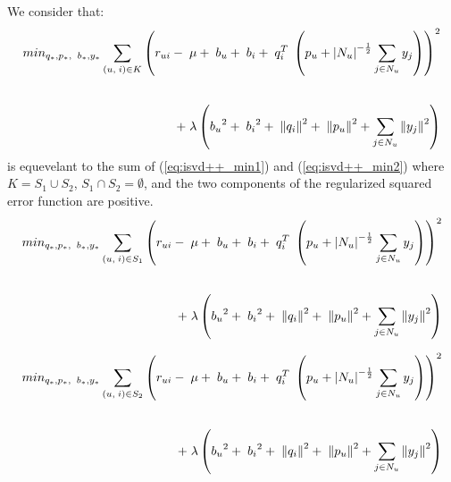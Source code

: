 \documentclass[oneside,13pt]{extreport}
\begin{document}
We consider that: 
\begin{eqnarray}
\label{eq:isvd++_min}
\begin{aligned}
mi{n_{{q_*},{p_*},\;\;{b_*},{y_*}}}\mathop \sum \limits_{\left( {u,\;i} \right) \in K} {\left( {{r_{ui}} - \;\mu  + \;{b_u} + \;{b_i} + \;q_i^T\;\left( {{p_u} + {{\left| {{N_u}} \right|}^{ - \frac{1}{2}}}\sum\limits_{j  \in {N_u}} {{y_j}} } \right)} \right)^2} \\[\jot]\\+ \;\lambda \left( {{b_u}^2 + \;{b_i}^2 + \;{{\left\| {{q_i}} \right\|}^2} + \;{{\left\| {{p_u}} \right\|}^2} + \sum\limits_{j \in {N_u}} {{{\left\| {{y_j}} \right\|}^2}} } \right)
\end{aligned}
\end{eqnarray}
is equevelant to the sum of (\ref{eq:isvd++_min1}) and (\ref{eq:isvd++_min2}) where $K= S_1 \cup S_2$, $S_1 \cap S_2 = \emptyset$, and the two components of the regularized squared error function are positive.
\begin{eqnarray}
\label{eq:isvd++_min1}
\begin{aligned}
mi{n_{{q_*},{p_*},\;\;{b_*},{y_*}}}\mathop \sum \limits_{\left( {u,\;i} \right) \in S_1} {\left( {{r_{ui}} - \;\mu  + \;{b_u} + \;{b_i} + \;q_i^T\;\left( {{p_u} + {{\left| {{N_u}} \right|}^{ - \frac{1}{2}}}\sum\limits_{j  \in {N_u}} {{y_j}} } \right)} \right)^2} \\[\jot]\\+ \;\lambda \left( {{b_u}^2 + \;{b_i}^2 + \;{{\left\| {{q_i}} \right\|}^2} + \;{{\left\| {{p_u}} \right\|}^2} + \sum\limits_{j \in {N_u}} {{{\left\| {{y_j}} \right\|}^2}} } \right)
\end{aligned}
\end{eqnarray}

\begin{eqnarray}
\label{eq:isvd++_min2}
\begin{aligned}
mi{n_{{q_*},{p_*},\;\;{b_*},{y_*}}}\mathop \sum \limits_{\left( {u,\;i} \right) \in S_2} {\left( {{r_{ui}} - \;\mu  + \;{b_u} + \;{b_i} + \;q_i^T\;\left( {{p_u} + {{\left| {{N_u}} \right|}^{ - \frac{1}{2}}}\sum\limits_{j  \in {N_u}} {{y_j}} } \right)} \right)^2} \\[\jot]\\+ \;\lambda \left( {{b_u}^2 + \;{b_i}^2 + \;{{\left\| {{q_i}} \right\|}^2} + \;{{\left\| {{p_u}} \right\|}^2} + \sum\limits_{j \in {N_u}} {{{\left\| {{y_j}} \right\|}^2}} } \right)
\end{aligned}
\end{eqnarray}
\end{document}
